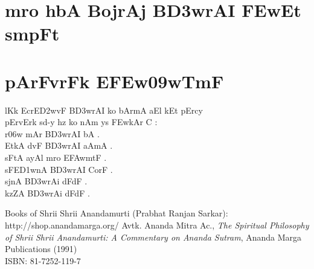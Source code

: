 \documentclass[12pt]{book}
\begin{document}
\frontmatter
%
\chapter*{\large {} }
\thispagestyle{empty}
\section*{\huge {}}
\newpage
%
\chapter*{\center \normalsize  {\dn m\?ro h\0bA BojrAj B\3D3wrAI \3FEwEt smpF{\qvb}t}}
%
%
\mainmatter
%
\chapter{ {\dn pArFvrFk E\3FEw\309wTmF}}
 {\dn l\?Kk EcrE\3D2wvF B\3D3wrAI ko bAr\?mA aEl kEt pErcy\\
pErvErk sd-y hz ko nAm ys \3FEwkAr C {\rs :\re} \\
r\?\306w mAr B\3D3wrAI bA .\\
EtkA d\?vF B\3D3wrAI aAmA . \\
sFtA ayA\0l m\?ro E\3FAwmtF . \\
sFE\3D1wnA B\3D3wrAI CorF . \\
sjnA B\3D3wrAi dFdF . \\
kzZA B\3D3wrAi dFdF . \\
}
%
\backmatter
%
\begin{thebibliography}{99}
Books of Shrii Shrii Anandamurti (Prabhat Ranjan Sarkar): \\
http://shop.anandamarga.org/
Avtk. Ananda Mitra Ac., \emph{The Spiritual Philosophy of Shrii Shrii Anandamurti: A Commentary on Ananda Sutram}, Ananda Marga Publications (1991) \\
ISBN: 81-7252-119-7
\end{thebibliography}
\end{document}
